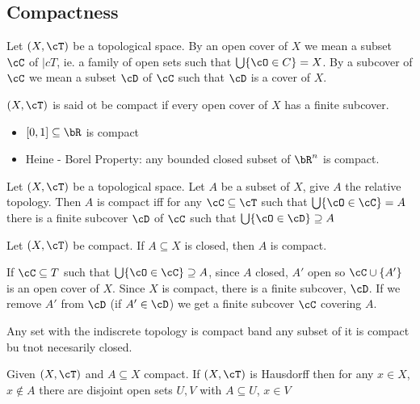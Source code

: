
\subsection{Compactness} 

\begin{definition}
    Let $(X, \cT)$ be a topological space. By an open cover of $X$ we mean a subset $\cC$ of $|cT$, ie. a family of open sets such that $\bigcup \{ \cO \in C\} = X$. By a subcover of $\cC$ we mean a subset $\cD$ of $\cC$ such that $\cD$ is a cover of $X$. 
\end{definition}

\begin{definition}
    $(X, \cT)$ is said ot be compact if every open cover of $X$ has a finite subcover. 
\end{definition}

\begin{itemize}
    \item $[0,1] \subseteq \bR$ is compact 
    \item Heine - Borel Property: any bounded closed subset of $\bR^n$ is compact. 
\end{itemize}

\noindent
Let $(X, \cT)$ be a topological space. Let $A$ be a subset of $X$, give $A$ the relative topology. Then $A$ is compact iff for any $\cC \subseteq \cT$ such that $\bigcup\{ \cO \in \cC\} = A$ there is a finite subcover $\cD$ of $\cC$ such that $\bigcup \{ \cO \in \cD\} \supseteq A$ 

\begin{proposition}
    Let $(X,\cT)$ be compact. If $A \subseteq X$ is closed, then $A$ is compact.
\end{proposition}

\begin{pf}
    If $\cC \subseteq T$ such that $\bigcup \{ \cO \in \cC\} \supseteq A$, since $A$ closed, $A'$ open so $\cC \cup \{A'\}$ is an open cover of $X$. Since $X$ is compact, there is a finite subcover, $\cD$. If we remove $A'$ from $\cD$ (if $A' \in \cD$) we get a finite subcover $\cC$ covering $A$. 
\end{pf}

Any set with the indiscrete topology is compact band any subset of it is compact bu tnot necesarily closed. 

\begin{proposition}
    Given $(X, \cT)$ and $A \subseteq X$ compact. If $(X, \cT)$ is Hausdorff then for any $x \in X$, $x \not\in A$ there are disjoint open sets $U, V$ with $A \subseteq U$, $x \in V$ 
\end{proposition}

